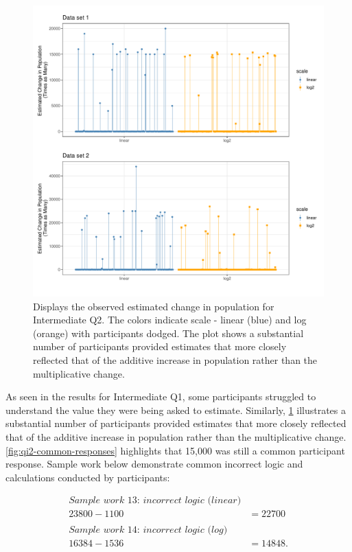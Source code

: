 \documentclass[print]{nuthesis}
\begin{document}
\begin{figure}[tbp]

{\centering \includegraphics[width=1\linewidth,]{thesis_files/figure-latex/qi2-plots-1} 

}

\caption[Intermediate Q2 observed plot]{Displays the observed estimated change in population for Intermediate Q2. The colors indicate scale - linear (blue) and log (orange) with participants dodged. The plot shows a substantial number of participants provided estimates that more closely reflected that of the additive increase in population rather than the multiplicative change.}\label{fig:qi2-plots}
\end{figure}

As seen in the results for Intermediate Q1, some participants struggled to understand the value they were being asked to estimate.
Similarly, \cref{fig:qi2-plots} illustrates a substantial number of participants provided estimates that more closely reflected that of the additive increase in population rather than the multiplicative change.
\cref{fig:qi2-common-responses} highlights that 15,000 was still a common participant response.
Sample work below demonstrate common incorrect logic and calculations conducted by participants:

\begin{align}
\textit{Sample work 13: incorrect logic (linear)} \nonumber\\
23800-1100&=22700 \nonumber\\
\nonumber\\
\textit{Sample work 14: incorrect logic (log)} \nonumber\\
16384-1536&=14848. \nonumber
\end{align}
\end{document}

